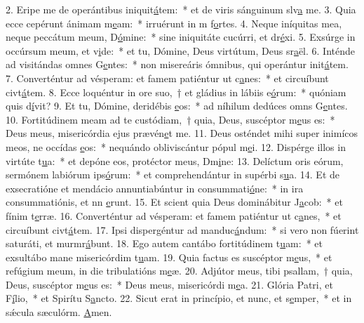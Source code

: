 2. Eripe me de operántibus iniquit\uline{á}tem:~* et de viris sánguinum slv\uline{a} me.
3. Quia ecce cepérunt ánimam m\uline{e}am:~* irruérunt in m f\uline{o}rtes.
4. Neque iníquitas mea, neque peccátum meum, D\uline{ó}mine:~* sine iniquitáte cucúrri, et dr\uline{é}xi.
5. Exsúrge in occúrsum meum, et v\uline{i}de:~* et tu, Dómine, Deus virtútum, Deus sr\uline{a}ël.
6. Inténde ad visitándas omnes G\uline{e}ntes:~* non misereáris ómnibus, qui operántur init\uline{á}tem.
7. Converténtur ad vésperam: et famem patiéntur ut c\uline{a}nes:~* et circuíbunt civt\uline{á}tem.
8. Ecce loquéntur in ore suo,~† et gládius in lábiis e\uline{ó}rum:~* quóniam quis d\uline{í}vit?
9. Et tu, Dómine, deridébis \uline{e}os:~* ad níhilum dedúces omns G\uline{e}ntes.
10. Fortitúdinem meam ad te custódiam,~† quia, Deus, suscéptor m\uline{e}us es:~* Deus meus, misericórdia ejus prævén\uline{e}t me.
11. Deus osténdet mihi super inimícos meos, ne occídas \uline{e}os:~* nequándo obliviscántur pópul m\uline{e}i.
12. Dispérge illos in virtúte t\uline{u}a:~* et depóne eos, protéctor meus, Dm\uline{i}ne:
13. Delíctum oris eórum, sermónem labiórum ips\uline{ó}rum:~* et comprehendántur in supérbi s\uline{u}a.
14. Et de exsecratióne et mendácio annuntiabúntur in consummati\uline{ó}ne:~* in ira consummatiónis, et nn \uline{e}runt.
15. Et scient quia Deus dominábitur J\uline{a}cob:~* et fínim t\uline{e}rræ.
16. Converténtur ad vésperam: et famem patiéntur ut c\uline{a}nes,~* et circuíbunt civt\uline{á}tem.
17. Ipsi dispergéntur ad manduc\uline{á}ndum:~* si vero non fúerint saturáti, et murmr\uline{á}bunt.
18. Ego autem cantábo fortitúdinem t\uline{u}am:~* et exsultábo mane misericórdim t\uline{u}am.
19. Quia factus es suscéptor m\uline{e}us,~* et refúgium meum, in die tribulatións m\uline{e}æ.
20. Adjútor meus, tibi psallam,~† quia, Deus, suscéptor m\uline{e}us es:~* Deus meus, misericórdi m\uline{e}a.
21. Glória Patri, et F\uline{í}lio,~* et Spirítu S\uline{a}ncto.
22. Sicut erat in princípio, et nunc, et s\uline{e}mper,~* et in sǽcula sæculórm. \uline{A}men.
